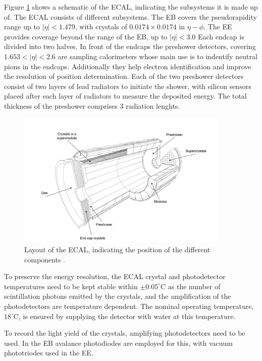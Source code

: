 Figure \ref{fig:CMS_ECAL} shows a schematic of the \ac{ECAL}, indicating
the subsystems it is made up of. The \ac{ECAL} consists of different subsystems. The \ac{EB} 
covers the pseudorapidity range up to $|\eta|<1.479$, with
crystals of $0.0174 \times 0.0174$ in $\eta - \phi$. The \ac{EE}
provides coverage beyond the range of the \ac{EB}, up to $|\eta|<3.0$
Each endcap is divided into two halves. In front of the endcaps 
the preshower detectors, covering $1.653<|\eta|<2.6$ are sampling
calorimeters whose main use is to indentify neutral pions in the endcaps. Additionally
they help electron identification and improve the resolution
of position determination. Each of the two preshower detectors consist
of two layers of lead radiators to initiate the shower, with silicon sensors
placed after each layer of radiators to measure the deposited energy. The 
total thickness of the preshower comprises 3 radiation lenghts.

\begin{figure}[h!]
\begin{center}
\includegraphics[width=0.9\textwidth]{./Detector/Plots/ECAL.png}
\caption{Layout of the \ac{ECAL}, indicating the position of the
different components \cite{cms-jinst}.}
\label{fig:CMS_ECAL}
\end{center}
\end{figure}

To preserve the energy resolution, the \ac{ECAL} crystal and
photodetector temperatures need to be kept stable within $\pm 0.05^{\circ}$C
as the number of scintillation photons emitted by the crystals,
and the amplification of the photodetectors are temperature dependent.
The nominal operating temperature, $18^{\circ}$C, is ensured by 
supplying the detector with water at this temperature.

To record the light yield of the crystals, amplifying photodetectors
need to be used. In the \ac{EB} avalance photodiodes are employed
for this, with vacuum phototriodes used in the \ac{EE}.

